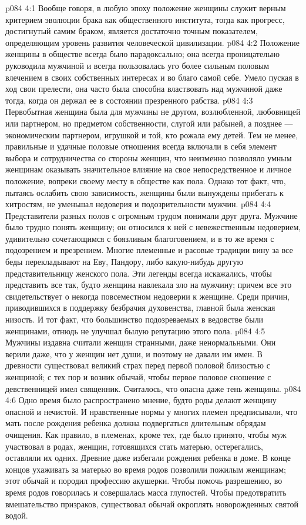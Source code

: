 \vs p084 4:1 Вообще говоря, в любую эпоху положение женщины служит верным критерием эволюции брака как общественного института, тогда как прогресс, достигнутый самим браком, является достаточно точным показателем, определяющим уровень развития человеческой цивилизации.
\vs p084 4:2 \pc Положение женщины в обществе всегда было парадоксально; она всегда проницательно руководила мужчиной и всегда пользовалась уго более сильным половым влечением в своих собственных интересах и во благо самой себе. Умело пуская в ход свои прелести, она часто была способна властвовать над мужчиной даже тогда, когда он держал ее в состоянии презренного рабства.
\vs p084 4:3 Первобытная женщина была для мужчины не другом, возлюбленной, любовницей или партнером, но предметом собственности, слугой или рабыней, а позднее --- экономическим партнером, игрушкой и той, кто рожала ему детей. Тем не менее, правильные и удачные половые отношения всегда включали в себя элемент выбора и сотрудничества со стороны женщин, что неизменно позволяло умным женщинам оказывать значительное влияние на свое непосредственное и личное положение, вопреки своему месту в обществе как пола. Однако тот факт, что, пытаясь ослабить свою зависимость, женщины были вынуждены прибегать к хитростям, не уменьшал недоверия и подозрительности мужчин.
\vs p084 4:4 \pc Представители разных полов с огромным трудом понимали друг друга. Мужчине было трудно понять женщину; он относился к ней с невежественным недоверием, удивительно сочетающимся с боязливым благоговением, и в то же время с подозрением и презрением. Многие племенные и расовые традиции вину за все беды перекладывают на Еву, Пандору, либо какую\hyp{}нибудь другую представительницу женского пола. Эти легенды всегда искажались, чтобы представить все так, будто женщина навлекала зло на мужчину; причем все это свидетельствует о некогда повсеместном недоверии к женщине. Среди причин, приводившихся в поддержку безбрачия духовенства, главной была женская низость. И тот факт, что большинство подозреваемых в ведовстве были женщинами, отнюдь не улучшал былую репутацию этого пола.
\vs p084 4:5 Мужчины издавна считали женщин странными, даже ненормальными. Они верили даже, что у женщин нет души, и поэтому не давали им имен. В древности существовал великий страх перед первой половой близостью с женщиной; с тех пор и возник обычай, чтобы первое половое сношение с девственницей имел священник. Считалось, что опасна даже тень женщины.
\vs p084 4:6 Одно время было распространено мнение, будто роды делают женщину опасной и нечистой. И нравственные нормы у многих племен предписывали, что мать после рождения ребенка должна подвергаться длительным обрядам очищения. Как правило, в племенах, кроме тех, где было принято, чтобы муж участвовал в родах, женщин, готовящихся стать матерью, остерегались, оставляли их одних. Древние даже избегали рождения ребенка в доме. В конце концов ухаживать за матерью во время родов позволили пожилым женщинам; этот обычай и породил профессию акушерки. Чтобы помочь разрешению, во время родов говорилась и совершалась масса глупостей. Чтобы предотвратить вмешательство призраков, существовал обычай окроплять новорожденных святой водой.
